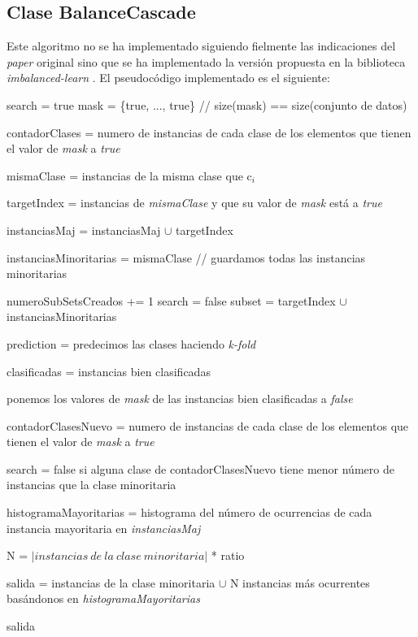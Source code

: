 \subsection{Clase BalanceCascade} \label{subsec:impl_balancecascade}

Este algoritmo no se ha implementado siguiendo fielmente las indicaciones del \textit{paper} original sino que se ha implementado la versión propuesta en la biblioteca \textit{imbalanced-learn} \cite{imbalanced-learn}. El pseudocódigo implementado es el siguiente:

\begin{codigo}
\begin{algorithmic}[1] \label{pseudocode:bc}
\State search = true 
\State mask = \{true, ..., true\} // size(mask) == size(conjunto de datos)
\State \parbox[t]{305pt}{contadorClases = numero de instancias de cada clase de los elementos que tienen el valor de \textit{mask} a \textit{true}\strut}
\State mismaClase = instancias de la misma clase que c$_i$
\State \parbox[t]{275pt}{targetIndex = instancias de \textit{mismaClase} y que su valor de \textit{mask} está a \textit{true} \strut}
\State instanciasMaj = instanciasMaj $\cup$ targetIndex
\end{algorithmic}
\end{codigo}
	
\begin{codigo}
\begin{algorithmic}[1]
\Else
\State \parbox[t]{275pt}{instanciasMinoritarias = mismaClase // guardamos todas las instancias minoritarias \strut}
\EndIf
\EndFor
\State numeroSubSetsCreados += 1
\State search = false
\EndIf
\State subset = targetIndex $\cup$ instanciasMinoritarias
\State \parbox[t]{305pt}{prediction = predecimos las clases haciendo \textit{k-fold}\strut}
\State \parbox[t]{305pt}{clasificadas = instancias bien clasificadas\strut}
\State \parbox[t]{305pt}{ponemos los valores de \textit{mask} de las instancias bien clasificadas a \textit{false}\strut}
\State \parbox[t]{305pt}{contadorClasesNuevo = numero de instancias de cada clase de los elementos que tienen el valor de \textit{mask} a \textit{true}\strut}
\State \parbox[t]{305pt}{search = false si alguna clase de contadorClasesNuevo tiene menor número de instancias que la clase minoritaria\strut}
\EndWhile
\State \parbox[t]{305pt}{histogramaMayoritarias = histograma del número de ocurrencias de cada instancia mayoritaria en \textit{instanciasMaj} \strut}
\State \parbox[t]{305pt}{N = $\left | instancias\ de\ la\ clase\ minoritaria \right |$ * ratio\strut}
\State \parbox[t]{305pt}{salida = instancias de la clase minoritaria $\cup$ N instancias más ocurrentes basándonos en \textit{histogramaMayoritarias} \strut}
\State \Return salida
\EndFunction 
\end{algorithmic}
\end{codigo}

